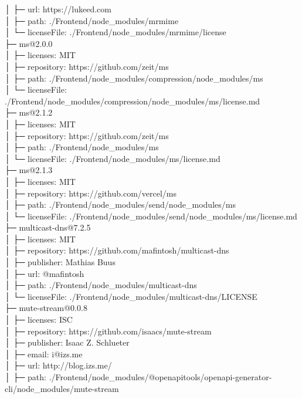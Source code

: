 │  ├─ url: https://lukeed.com\\
│  ├─ path: ./Frontend/node\_modules/mrmime\\
│  └─ licenseFile: ./Frontend/node\_modules/mrmime/license\\
├─ ms@2.0.0\\
│  ├─ licenses: MIT\\
│  ├─ repository: https://github.com/zeit/ms\\
│  ├─ path: ./Frontend/node\_modules/compression/node\_modules/ms\\
│  └─ licenseFile: ./Frontend/node\_modules/compression/node\_modules/ms/license.md\\
├─ ms@2.1.2\\
│  ├─ licenses: MIT\\
│  ├─ repository: https://github.com/zeit/ms\\
│  ├─ path: ./Frontend/node\_modules/ms\\
│  └─ licenseFile: ./Frontend/node\_modules/ms/license.md\\
├─ ms@2.1.3\\
│  ├─ licenses: MIT\\
│  ├─ repository: https://github.com/vercel/ms\\
│  ├─ path: ./Frontend/node\_modules/send/node\_modules/ms\\
│  └─ licenseFile: ./Frontend/node\_modules/send/node\_modules/ms/license.md\\
├─ multicast-dns@7.2.5\\
│  ├─ licenses: MIT\\
│  ├─ repository: https://github.com/mafintosh/multicast-dns\\
│  ├─ publisher: Mathias Buus\\
│  ├─ url: @mafintosh\\
│  ├─ path: ./Frontend/node\_modules/multicast-dns\\
│  └─ licenseFile: ./Frontend/node\_modules/multicast-dns/LICENSE\\
├─ mute-stream@0.0.8\\
│  ├─ licenses: ISC\\
│  ├─ repository: https://github.com/isaacs/mute-stream\\
│  ├─ publisher: Isaac Z. Schlueter\\
│  ├─ email: i@izs.me\\
│  ├─ url: http://blog.izs.me/\\
│  ├─ path: ./Frontend/node\_modules/@openapitools/openapi-generator-cli/node\_modules/mute-stream\\
